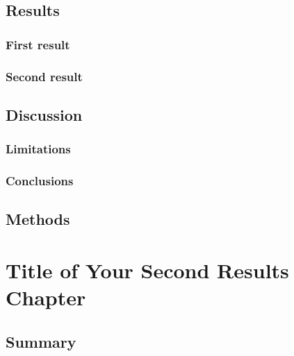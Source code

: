     \section{Results}
        \subsection{First result}
        \label{sec:ch2_result1}
        
        \subsection{Second result}
        \label{sec:ch2_result2}
        

    \section{Discussion}
    \label{sec:ch2_discussion}
    
        \subsection{Limitations}
        \label{sec:ch2_limitations}
        
        \subsection{Conclusions}
        \label{sec:ch2_conclusions}
        

    \section{Methods}
    \label{sec:ch2_methods}
    
\newpage

\chapter{Title of Your Second Results Chapter}
\label{ch:ch3}
    \section{Summary}
    \label{sec:ch3_summary}
    

